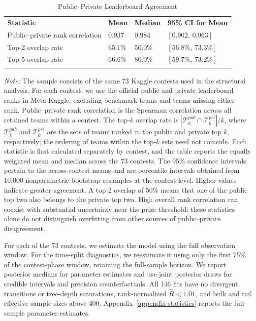 \documentclass[mnsc]{informs3}
\newcommand{\figtabnotesize}{\TableSpaced\footnotesize}
\begin{document}
\begin{table}[!htbp]
\centering
\caption{Public--Private Leaderboard Agreement}
\label{tab-leaderboard-agreement}
\small
\begin{tabularx}{\textwidth}{lYYY}
\toprule
\textbf{Statistic} & \textbf{Mean} & \textbf{Median} & \textbf{95\% CI for Mean} \\
\addlinespace[0.25ex]
\addlinespace[0.25ex]
Public--private rank correlation & $0.937$ & $0.984$ & {$[0.902,\ 0.963]$} \\
Top-2 overlap rate & $65.1\%$ & $50.0\%$ & {$[56.8\%,\ 73.3\%]$} \\
Top-5 overlap rate & $66.6\%$ & $80.0\%$ & $[59.7\%,\ 73.2\%]$ \\
\bottomrule
\addlinespace[0.5ex]
\end{tabularx}
\par\vspace{1.2ex}
\begin{minipage}{\textwidth}\figtabnotesize
{\footnotesize
\textit{Note:}
The sample consists of the same 73 Kaggle contests used in the structural analysis. For each contest, we use the official public and private leaderboard ranks in Meta-Kaggle, excluding benchmark teams and teams missing either rank. Public--private rank correlation is the Spearman correlation across all retained teams within a contest. The top-$k$ overlap rate is $|\mathcal T^{pub}_{k}\cap\mathcal T^{pri}_{k}|/k$, where $\mathcal T^{pub}_{k}$ and $\mathcal T^{pri}_{k}$ are the sets of teams ranked in the public and private top $k$, respectively; the ordering of teams within the top-$k$ sets need not coincide. Each statistic is first calculated separately by contest, and the table reports the equally weighted mean and median across the 73 contests. The 95\% confidence intervals pertain to the across-contest means and are percentile intervals obtained from 10,000 nonparametric bootstrap resamples at the contest level. Higher values indicate greater agreement. A top-2 overlap of 50\% means that one of the public top two also belongs to the private top two. High overall rank correlation can coexist with substantial uncertainty near the prize threshold; these statistics alone do not distinguish overfitting from other sources of public--private disagreement.
}
\end{minipage}
\end{table}

For each of the 73 contests, we estimate the model using the full observation window. For the time-split diagnostics, we reestimate it using only the first 75\% of the contest-phase window, retaining the full-sample horizon. We report posterior medians for parameter estimates and use joint posterior draws for credible intervals and precision counterfactuals. All 146 fits have no divergent transitions or tree-depth saturations, rank-normalized $\widehat R<1.01$, and bulk and tail effective sample sizes above 400. Appendix~\ref{appendix-statistics} reports the full-sample parameter estimates.
\end{document}
